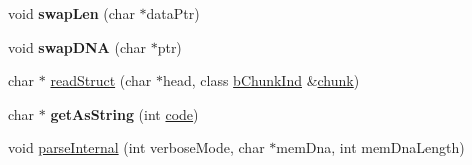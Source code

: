 \begin{DoxyCompactItemize}
\item 
\hypertarget{classb_parse_1_1b_file_a875ab7a243a64045fc7c5ba6221fb6ba}{void {\bfseries swap\+Len} (char $\ast$data\+Ptr)}\label{classb_parse_1_1b_file_a875ab7a243a64045fc7c5ba6221fb6ba}

\item 
\hypertarget{classb_parse_1_1b_file_ae836c09059c43f2f352f102796d80cf4}{void {\bfseries swap\+D\+N\+A} (char $\ast$ptr)}\label{classb_parse_1_1b_file_ae836c09059c43f2f352f102796d80cf4}

\item 
char $\ast$ \hyperlink{classb_parse_1_1b_file_a66f6614a7df03f089240fc25539f0fa1}{read\+Struct} (char $\ast$head, class \hyperlink{classb_parse_1_1b_chunk_ind}{b\+Chunk\+Ind} \&\hyperlink{structchunk}{chunk})
\item 
\hypertarget{classb_parse_1_1b_file_a21ece4c11349d31dc48eac217cf66dcc}{char $\ast$ {\bfseries get\+As\+String} (int \hyperlink{structcode}{code})}\label{classb_parse_1_1b_file_a21ece4c11349d31dc48eac217cf66dcc}

\item 
void \hyperlink{classb_parse_1_1b_file_a2a8cb9d151dfa612f0eb86a705f4bb5d}{parse\+Internal} (int verbose\+Mode, char $\ast$mem\+Dna, int mem\+Dna\+Length)
\end{DoxyCompactItemize}
